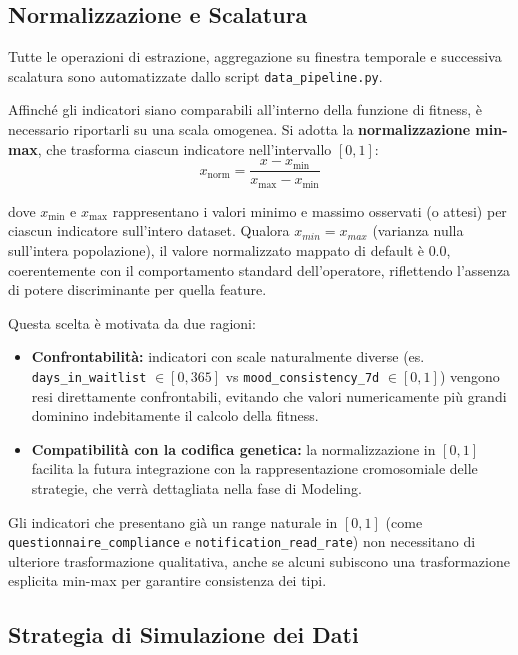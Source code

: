 \subsection{Normalizzazione e Scalatura}
\label{subsec:normalizzazione_churn}

Tutte le operazioni di estrazione, aggregazione su finestra temporale e successiva scalatura sono automatizzate dallo script \texttt{data\_pipeline.py}. 

Affinché gli indicatori siano comparabili all'interno della funzione di fitness, è necessario riportarli su una scala omogenea. Si adotta la \textbf{normalizzazione min-max}, che trasforma ciascun indicatore nell'intervallo $[0, 1]$:
\begin{equation*}
    x_{\text{norm}} = \frac{x - x_{\min}}{x_{\max} - x_{\min}}
\end{equation*}

dove $x_{\min}$ e $x_{\max}$ rappresentano i valori minimo e massimo osservati (o attesi) per ciascun indicatore sull'intero dataset. Qualora $x_{min} = x_{max}$ (varianza nulla sull'intera popolazione), il valore normalizzato mappato di default è $0.0$, coerentemente con il comportamento standard dell'operatore, riflettendo l'assenza di potere discriminante per quella feature.

Questa scelta è motivata da due ragioni:
\begin{itemize}
    \item \textbf{Confrontabilità:} indicatori con scale naturalmente diverse (es. \texttt{days\_in\_waitlist} $\in [0, 365]$ vs \texttt{mood\_consistency\_7d} $\in [0, 1]$) vengono resi direttamente confrontabili, evitando che valori numericamente più grandi dominino indebitamente il calcolo della fitness.
    \item \textbf{Compatibilità con la codifica genetica:} la normalizzazione in $[0, 1]$ facilita la futura integrazione con la rappresentazione cromosomiale delle strategie, che verrà dettagliata nella fase di Modeling.
\end{itemize}

Gli indicatori che presentano già un range naturale in $[0, 1]$ (come \texttt{questionnaire\_compliance} e \texttt{notification\_read\_rate}) non necessitano di ulteriore trasformazione qualitativa, anche se alcuni subiscono una trasformazione esplicita min-max per garantire consistenza dei tipi.

\subsection{Strategia di Simulazione dei Dati}
\label{subsec:simulazione_churn}

